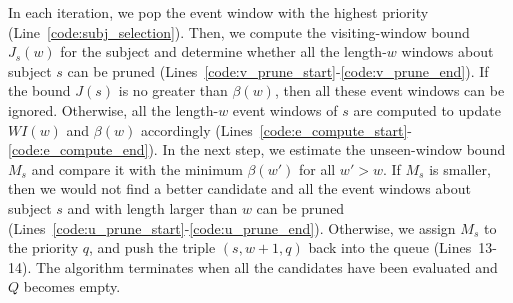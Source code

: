 In each iteration, we pop the event window with the highest priority (Line~\ref{code:subj_selection}). Then, we compute the visiting-window bound $J_s(w)$ for the subject and determine whether all the length-$w$ windows about subject $s$ can be pruned (Lines~\ref{code:v_prune_start}-\ref{code:v_prune_end}). If the bound $J(s)$ is no greater than $\beta(w)$, then all these event windows can be ignored. Otherwise, all the length-$w$ event windows of $s$ are computed to update $WI(w)$ and $\beta(w)$ accordingly (Lines~\ref{code:e_compute_start}-\ref{code:e_compute_end}).
In the next step, we estimate the unseen-window bound $M_s$ and compare it with the minimum $\beta(w')$ for all $w'> w$. If $M_s$ is smaller, then we would not find a better candidate and all the event windows about subject $s$ and with length larger than $w$ can be pruned (Lines~\ref{code:u_prune_start}-\ref{code:u_prune_end}). Otherwise, we assign $M_s$ to the priority $q$, and push the triple $(s,w+1,q)$ back into the queue (Lines~13-14). The algorithm terminates when all the candidates have been evaluated and $Q$ becomes empty.





